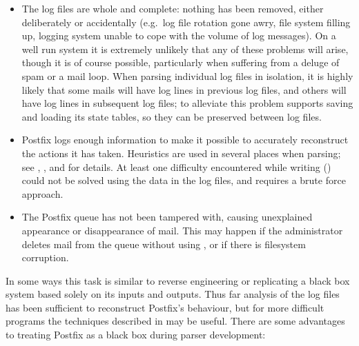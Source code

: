 \begin{itemize}

    \item The log files are whole and complete: nothing has been removed,
        either deliberately or accidentally (e.g.\ log file rotation gone
        awry, file system filling up, logging system unable to cope with
        the volume of log messages).  On a well run system it is extremely
        unlikely that any of these problems will arise, though it is of
        course possible, particularly when suffering from a deluge of spam
        or a mail loop.  When parsing individual log files in isolation,
        it is highly likely that some mails will have log lines in previous
        log files, and others will have log lines in subsequent log files;
        to alleviate this problem \parsername{} supports saving and loading
        its state tables, so they can be preserved between log files.

    \item Postfix logs enough information to make it possible to accurately
        reconstruct the actions it has taken.  Heuristics are used in
        several places when parsing; see , , and
         for details.  At least
        one difficulty encountered while writing \parsername{}
        () could not be
        solved using the data in the log files, and requires a brute force
        approach.

    \item The Postfix queue has not been tampered with, causing unexplained
        appearance or disappearance of mail.  This may happen if the
        administrator deletes mail from the queue without using
        , or if there is filesystem corruption.

\end{itemize}

In some ways this task is similar to reverse engineering or replicating a
black box system based solely on its inputs and outputs.  Thus far
analysis of the log files has been sufficient to reconstruct Postfix's
behaviour, but for more difficult programs the techniques described in
\cite{black-box-error-reporting} may be useful.  There are some advantages
to treating Postfix as a black box during parser development:


